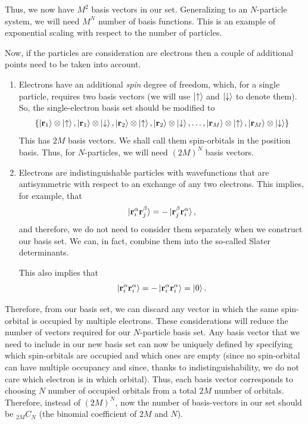 \documentclass[12pt,oneside]{book}
\begin{document}
Thus, we now have $M^2$ basis vectors in our set. Generalizing to an $N$-particle system, we will need $M^N$ number of basis functions. This is an example of exponential scaling with respect to the number of particles.

Now, if the particles are consideration are electrons then a couple of additional points need to be taken into account.
\begin{enumerate}
    \item Electrons have an additional \textit{spin} degree of freedom, which, for a single particle, requires two basis vectors (we will use $\ket{\uparrow}$ and $\ket{\downarrow}$ to denote them). So, the single-electron basis set should be modified to 
    \begin{align*}
        \{\ket{\mathbf{r}_1}\otimes\ket{\uparrow}, \ket{\mathbf{r}_1}\otimes\ket{\downarrow}, \ket{\mathbf{r}_2}\otimes\ket{\uparrow}, \ket{\mathbf{r}_2}\otimes\ket{\downarrow},\hdots, \ket{\mathbf{r}_M}\otimes\ket{\uparrow}, \ket{\mathbf{r}_M}\otimes\ket{\downarrow}\}
    \end{align*}
    This has $2M$ basis vectors.  We shall call them spin-orbitals in the position basis. Thus, for $N$-particles, we will need $(2M)^N$ basis vectors.
    \item Electrons are indistinguishable particles with wavefunctions that are antisymmetric with respect to an exchange of any two electrons. This implies, for example, that
    \begin{align}
        \ket{\mathbf{r}_i^\alpha\mathbf{r}_j^\beta} = -\ket{\mathbf{r}_j^\beta\mathbf{r}_i^\alpha},
    \end{align}
    and therefore, we do not need to consider them separately when we construct our basis set. We can, in fact, combine them into the so-called Slater determinants.

    This also implies that
\begin{align}
\ket{\mathbf{r}_i^\alpha\mathbf{r}_i^\alpha}=-\ket{\mathbf{r}_i^\alpha\mathbf{r}_i^\alpha}=\ket{0}.
\end{align}

\end{enumerate}

Therefore, from our basis set, we can discard any vector in which the same spin-orbital is occupied by multiple electrons. These considerations will reduce the number of vectors required for our $N$-particle basis set. Any basis vector that we need to include in our new basis set can now be uniquely defined by specifying which spin-orbitals are occupied and which ones are empty (since no spin-orbital can have multiple occupancy and since, thanks to indistinguishability, we do not care which electron is in which orbital). Thus, each basis vector corresponds to choosing $N$ number of occupied orbitals from a total $2M$ number of orbitals. Therefore, instead of $(2M)^N$, now the number of basis-vectors in our set should be $_{2M}C_N$ (the binomial coefficient of $2M$ and $N$). 
\end{document}
